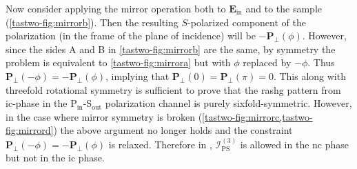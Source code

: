 Now consider applying the mirror operation both to $\bm{E}_\mathrm{in}$ and to the sample (\cref{tastwo-fig:mirrorb}).
Then the resulting $S$-polarized component of the polarization (in the frame of the plane of incidence) will be $-\bm{P}_\perp(\phi)$.
However, since the sides A and B in \cref{tastwo-fig:mirrorb} are the same, by symmetry the problem is equivalent to \cref{tastwo-fig:mirrora} but with $\phi$ replaced by $-\phi$.
Thus $\bm{P}_\perp(-\phi) = -\bm{P}_\perp(\phi)$, implying that $\bm{P}_\perp(0) = \bm{P}_\perp(\pi) = 0$.
This along with threefold rotational symmetry is sufficient to prove that the \gls{rashg} pattern from \gls{ic}-phase \tastwo in the P$_\mathrm{in}$-S$_\mathrm{out}$ polarization channel is purely sixfold-symmetric.
However, in the case where mirror symmetry is broken (\cref{tastwo-fig:mirrorc,tastwo-fig:mirrord}) the above argument no longer holds and the constraint $\bm{P}_\perp(-\phi) = -\bm{P}_\perp(\phi)$ is relaxed.
Therefore in \tastwo, $\mathscr{I}_\mathrm{PS}^{(3)}$ is allowed in the \gls{nc} phase but not in the \gls{ic} phase.


